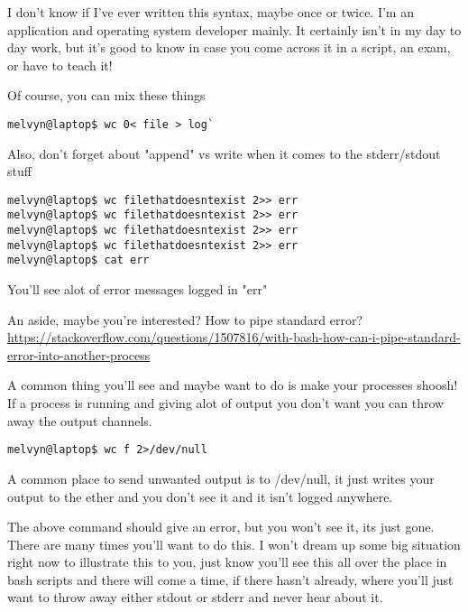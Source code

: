 \documentclass[10pt]{article}
\begin{document}
I don't know if I've ever written this syntax, maybe once or twice. I'm an application and operating system developer mainly. It certainly isn't in my day to day work, but it's good to know in case you come across it in a script, an exam, or have to teach it!


Of course, you can mix these things

\begin{lstlisting}[style=term]
melvyn@laptop$ wc 0< file > log`
\end{lstlisting}

Also, don't forget about "append" vs write when it comes to the stderr/stdout stuff

\begin{lstlisting}[style=term]
melvyn@laptop$ wc filethatdoesntexist 2>> err
melvyn@laptop$ wc filethatdoesntexist 2>> err
melvyn@laptop$ wc filethatdoesntexist 2>> err
melvyn@laptop$ wc filethatdoesntexist 2>> err
melvyn@laptop$ cat err
\end{lstlisting}

You'll see alot of error messages logged in "err"

An aside, maybe you're interested? How to pipe standard error?
\url{https://stackoverflow.com/questions/1507816/with-bash-how-can-i-pipe-standard-error-into-another-process}

A common thing you'll see and maybe want to do is make your processes shoosh! If a process is running and giving alot of output you don't want you can throw away the output channels.

\begin{lstlisting}[style=term]
melvyn@laptop$ wc f 2>/dev/null 
\end{lstlisting}

A common place to send unwanted output is to /dev/null, it just writes your output to the ether and you don't see it and it isn't logged anywhere.

The above command should give an error, but you won't see it, its just gone. There are many times you'll want to do this. I won't dream up some big situation right now to illustrate this to you, just know you'll see this all over the place in bash scripts and there will come a time, if there hasn't already, where you'll just want to throw away either stdout or stderr and never hear about it.
\end{document}
